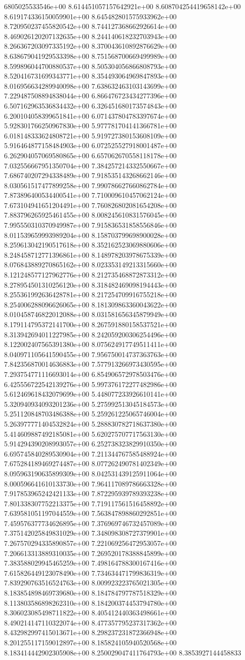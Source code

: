 6805025533546e+00	8.614451057157642921e+00	8.608704254419658142e+00	8.619174336150059901e+00	8.645482801575933962e+00	8.720950237455820542e+00	8.744127368662926614e+00	8.469026120207132635e+00	8.244140618232703943e+00	8.266367203097335192e+00	8.370043610892876629e+00	8.638679041929533398e+00	8.751568700669499989e+00	8.599896044700880537e+00	8.505304056866808793e+00	8.520416731699343771e+00	8.354493064969847893e+00	8.016956634289940098e+00	7.638632463103143699e+00	7.229487508894838044e+00	6.866476723434277396e+00	6.507162963536834432e+00	6.326451680173574843e+00	6.200104058399651841e+00	6.071437804783397674e+00	5.928301766250967830e+00	5.977781704141366781e+00	6.018148333624808721e+00	5.919727380153608109e+00	5.916464877158484903e+00	6.072525527918001487e+00	6.262904057069580865e+00	6.657062670558118178e+00	7.032556667951350704e+00	7.384257214332550667e+00	7.686740207294338489e+00	7.918535143268662146e+00	8.030561517477899258e+00	7.990786627660862784e+00	7.873896400534400541e+00	7.710009610457062124e+00	7.673104941651204491e+00	7.760826802081654208e+00	7.883796265925461455e+00	8.008245610831576045e+00	7.995550310370949987e+00	7.915836531858556846e+00	8.011539659993989204e+00	8.158703799698900028e+00	8.259613042190517618e+00	8.352162523069880606e+00	8.248458712771396861e+00	8.148978203978675339e+00	8.076843889270865162e+00	8.023353149213315660e+00	8.121248577127962776e+00	8.212735468872873312e+00	8.278954501310256120e+00	8.318482469098194443e+00	8.255361992636428781e+00	8.217254709916755218e+00	8.254006288096626065e+00	8.181309863360043622e+00	8.010458746822012088e+00	8.031581656345879949e+00	8.179114795372141700e+00	8.267591880158537521e+00	8.313942694011227985e+00	8.242059200306254496e+00	8.122002407565391380e+00	8.075624917749511411e+00	8.040971105641590455e+00	7.956750014737363763e+00	7.842356870014636883e+00	7.577913266973430595e+00	7.293754771116693014e+00	6.854906572978503476e+00	6.425556722542139276e+00	5.997376172277482986e+00	5.612469618432079699e+00	5.448077233926610141e+00	5.320940934093201236e+00	5.275992513045184573e+00	5.251120848703486388e+00	5.259261225065746004e+00	5.263977771404532824e+00	5.288830782718637380e+00	5.414609887492185081e+00	5.620275707717563130e+00	5.914294390208993057e+00	6.252738323829910350e+00	6.695745840289530904e+00	7.211344767585488924e+00	7.675284189469274487e+00	8.077262490781402349e+00	8.095963190635899309e+00	8.042531439125911064e+00	8.000596641610133730e+00	7.964117089786663328e+00	7.917853965242421133e+00	7.872295939789393238e+00	7.801338307752213375e+00	7.719117561516458892e+00	7.639581051197044559e+00	7.563847898860292851e+00	7.459576377734626895e+00	7.376969746732457089e+00	7.375142025849831029e+00	7.348098308727379901e+00	7.267570294335890857e+00	7.221069256472953057e+00	7.206613313889310035e+00	7.269520178388845899e+00	7.383588029945465259e+00	7.498164788300167416e+00	7.615826449123078490e+00	7.734634471799836319e+00	7.839290763516524763e+00	8.009923223765021305e+00	8.183854898469739680e+00	8.184784797787518329e+00	8.113803586898262310e+00	8.184200374453794780e+00	8.306023085498711822e+00	8.405412440363498661e+00	8.490214147110322074e+00	8.477357795237317362e+00	8.432982997415013671e+00	8.298237231872366948e+00	8.201255117159012897e+00	8.185824105940520568e+00	8.183414442902305908e+00	8.250029047411764793e+00	8.3853927144458833